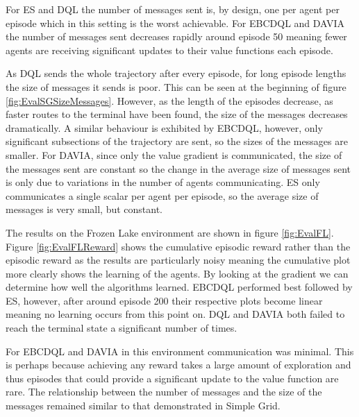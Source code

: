 For ES and DQL the number of messages sent is, by design, one per agent per episode which in this setting is the worst achievable. For EBCDQL and DAVIA the number of messages sent decreases rapidly around episode 50 meaning fewer agents are receiving significant updates to their value functions each episode.

As DQL sends the whole trajectory after every episode, for long episode lengths the size of messages it sends is poor. This can be seen at the beginning of figure \ref{fig:EvalSGSizeMessages}. However, as the length of the episodes decrease, as faster routes to the terminal have been found, the size of the messages decreases dramatically. A similar behaviour is exhibited by EBCDQL, however, only significant subsections of the trajectory are sent, so the sizes of the messages are smaller. For DAVIA, since only the value gradient is communicated, the size of the messages sent are constant so the change in the average size of messages sent is only due to variations in the number of agents communicating. ES only communicates a single scalar per agent per episode, so the average size of messages is very small, but constant.

The results on the Frozen Lake environment are shown in figure \ref{fig:EvalFL}. Figure \ref{fig:EvalFLReward} shows the cumulative episodic reward rather than the episodic reward as the results are particularly noisy meaning the cumulative plot more clearly shows the learning of the agents. By looking at the gradient we can determine how well the algorithms learned. EBCDQL performed best followed by ES, however, after around episode 200 their respective plots become linear meaning no learning occurs from this point on. DQL and DAVIA both failed to reach the terminal state a significant number of times.

For EBCDQL and DAVIA in this environment communication was minimal. This is perhaps because achieving any reward takes a large amount of exploration and thus episodes that could provide a significant update to the value function are rare. The relationship between the number of messages and the size of the messages remained similar to that demonstrated in Simple Grid.

